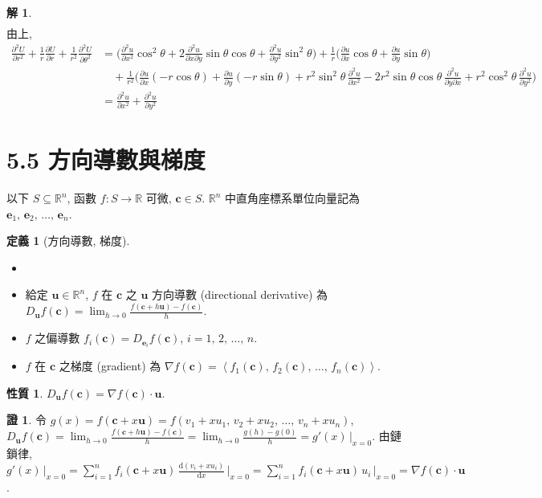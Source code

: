 \documentclass[12pt]{extarticle}
\newcommand{\ds}{\displaystyle}
\newcommand{\llt}{\left\langle}
\newcommand{\rgt}{\right\rangle}
\theoremstyle{definition}
\newtheorem*{dfn}{定義}
\newtheorem*{prp}{性質}
\newtheorem*{sol}{解}
\newtheorem*{prf}{證}
\newcommand{\vc}{\mathbf{c}}
\newcommand{\ve}{\mathbf{e}}
\newcommand{\vu}{\mathbf{u}}
\newcommand{\pdiff}[2]{\frac{\partial #1}{\partial #2}}
\newcommand{\pdifft}[2]{\frac{\partial^2 #1}{\partial #2^2}}
\newcommand{\diff}[2]{\frac{\mathrm{d} #1}{\mathrm{d} #2}}
\begin{document}
\begin{sol}
\begin{align*}
  \end{align*}
  由上,  
  \begin{align*}
    \pdifft{U}{r} + \frac{1}{r}\pdiff{U}{r} + \frac{1}{r^2}\pdifft{U}{\theta} &= \bigg(\pdifft{u}{x}\cos^2\theta + 2\frac{\partial^2 u}{\partial x\partial y}\sin\theta\cos\theta + \pdifft{u}{y}\sin^2\theta\bigg) + \frac{1}{r}\bigg(\pdiff{u}{x}\cos\theta + \pdiff{u}{y}\sin\theta\bigg) \\ &\quad+ \frac{1}{r^2}\bigg(\pdiff{u}{x}(-r\cos\theta) + \pdiff{u}{y}(-r\sin\theta) + r^2\sin^2\theta\,\pdifft{u}{x} -2r^2\sin\theta\cos\theta\,\frac{\partial^2 u}{\partial y\partial x} + r^2\cos^2\theta\,\pdifft{u}{y}\bigg) \\ &= \pdifft{u}{x}+ \pdifft{u}{y}
  \end{align*}
\end{sol}

\section*{5.5 方向導數與梯度}

以下 $\ds S\subseteq\mathbb{R}^n$, 函數 $\ds f:S\to\mathbb{R}$ 可微, $\vc\in S$. $\mathbb{R}^n$ 中直角座標系單位向量記為 $\ve_1,\,\ve_2,\,\ldots,\,\ve_n$.

\begin{dfn}[方向導數, 梯度]
  \begin{itemize}\setlength{\itemsep}{0pt}
    \item[]
    \item 給定 $\vu\in\mathbb{R}^n$, $f$ 在 $\vc$ 之 $\ds\vu$ 方向導數 (directional derivative) 為 $\ds D_{\vu}f(\vc) = \lim_{h\to 0}\frac{f(\vc + h\vu) - f(\vc)}{h}$. 
    \item $f$ 之偏導數 $\ds f_i(\vc) = D_{\ve_i}f(\vc)$, $i = 1,\,2,\,\ldots,\,n$. 
    \item $f$ 在 $\vc$ 之梯度 (gradient) 為 $\ds\nabla f(\vc) = \llt f_1(\vc),\,f_2(\vc),\,\ldots,\,f_n(\vc)\rgt$. 
  \end{itemize}
\end{dfn}

\begin{prp}
  $\ds D_{\vu}f(\vc) = \nabla f(\vc)\cdot\vu$.  
\end{prp}

\begin{prf}
  令 $\ds g(x) = f(\vc + x\vu) = f(v_1 + x u_1,\,v_2 + x u_2,\,\ldots,\,v_n + x u_n)$, $\ds D_{\vu}f(\vc) = \lim_{h\to 0}\frac{f(\vc + h\vu) - f(\vc)}{h} = \lim_{h\to 0}\frac{g(h) - g(0)}{h} = g'(x)\,\big|_{x = 0}$. 由鏈鎖律, $\ds g'(x)\,\big|_{x = 0} = \sum_{i = 1}^n f_i(\vc + x\vu)\,\diff{(v_i + x u_i)}{x}\,\bigg|_{x = 0} = \sum_{i = 1}^n f_i(\vc + x\vu)\,u_i\,\bigg|_{x = 0} = \nabla f(\vc)\cdot\vu$. 
\end{prf}
\end{document}
